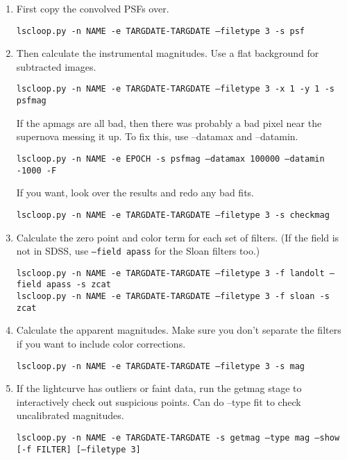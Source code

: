 \begin{enumerate}

\item First copy the convolved PSFs over.

{\tt lscloop.py -n NAME -e TARGDATE-TARGDATE --filetype 3 -s psf}

\item Then calculate the instrumental magnitudes. Use a flat background for subtracted images.

{\tt lscloop.py -n NAME -e TARGDATE-TARGDATE --filetype 3 -x 1 -y 1 -s psfmag }

If the apmags are all bad, then there was probably a bad pixel near the supernova messing it up. To fix this, use --datamax and --datamin.

{\tt lscloop.py -n NAME -e EPOCH -s psfmag --datamax 100000 --datamin -1000 -F}

If you want, look over the results and redo any bad fits.

{\tt lscloop.py -n NAME -e TARGDATE-TARGDATE --filetype 3 -s checkmag}

\item Calculate the zero point and color term for each set of filters. (If the field is not in SDSS, use {\tt --field apass} for the Sloan filters too.)

{\tt lscloop.py -n NAME -e TARGDATE-TARGDATE --filetype 3 -f landolt --field apass -s zcat }\\
{\tt lscloop.py -n NAME -e TARGDATE-TARGDATE --filetype 3 -f sloan -s zcat }

\item Calculate the apparent magnitudes. Make sure you don't separate the filters if you want to include color corrections.

{\tt lscloop.py -n NAME -e TARGDATE-TARGDATE --filetype 3 -s mag }

\item If the lightcurve has outliers or faint data, run the getmag stage to interactively check out suspicious points. Can do --type fit to check uncalibrated magnitudes.

{\tt lscloop.py -n NAME -e TARGDATE-TARGDATE -s getmag --type mag --show [-f FILTER] [--filetype 3]}

\end{enumerate}